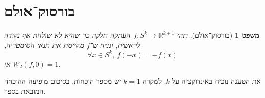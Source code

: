 \documentclass[aspectratio=169,notheorems,mathserif]{beamer}
\newcommand{\RR}[0]{\mathbb{R}}
\theoremstyle{c_plain}
\newtheorem{theorem}{משפט}[section]
\theoremstyle{c_definition}
\theoremstyle{c_remark}
\begin{document}
\section{בורסוק־אולם}
\begin{frame}
	\begin{theorem}[בורסוק־אולם]
		תהי $f : S^k \to \RR^{k + 1}$ העתקה חלקה כך שהיא לא שולחת אף נקודה לראשית,
		ונניח ש־$f$ מקיימת את תנאי הסימטריה,
		\[
			\forall x \in S^k,\ 
			f(-x) = - f(x)
		\]
		אז $W_2(f, 0) = 1$.
	\end{theorem}
	את הטענה נוכיח באינדוקציה על $k$.
	למקרה $k = 1$ יש מספר הוכחות, בסיכום מופיעה ההוכחה המובאת בספר.
\end{frame}
\end{document}
